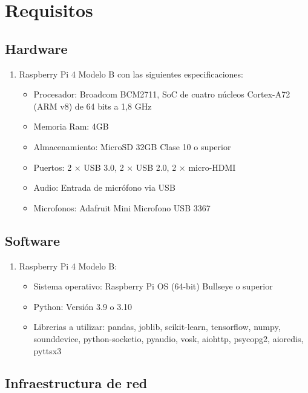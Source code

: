 \section*{Requisitos}

\subsection*{Hardware}

\begin{enumerate}
  \item Raspberry Pi 4 Modelo B con las siguientes especificaciones:
        \begin{itemize}
          \item Procesador: Broadcom BCM2711, SoC de cuatro núcleos Cortex-A72 (ARM v8) de 64 bits a 1,8 GHz
          \item Memoria Ram: 4GB
          \item Almacenamiento: MicroSD 32GB Clase 10 o superior
          \item Puertos: 2 × USB 3.0, 2 × USB 2.0, 2 × micro-HDMI
          \item Audio: Entrada de micrófono via USB
          \item Microfonos: Adafruit Mini Microfono USB 3367
        \end{itemize}
\end{enumerate}

\subsection*{Software}

\begin{enumerate}
  \item Raspberry Pi 4 Modelo B:
        \begin{itemize}
          \item Sistema operativo: Raspberry Pi OS (64-bit) Bullseye o superior
          \item Python: Versión 3.9 o 3.10
          \item Librerias a utilizar: pandas, joblib, scikit-learn, tensorflow, numpy, sounddevice, python-socketio, pyaudio, vosk, aiohttp, psycopg2, aioredis, pyttsx3
        \end{itemize}
\end{enumerate}

\subsection*{Infraestructura de red}

